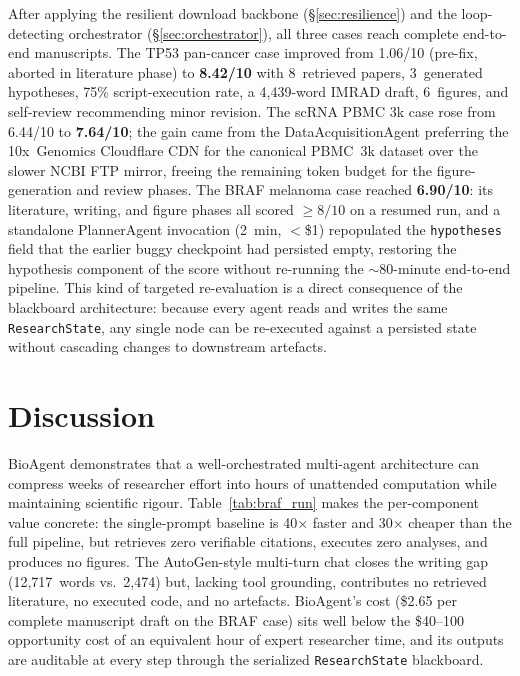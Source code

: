 \documentclass[11pt]{article}
\begin{document}
After applying the resilient download backbone (\S\ref{sec:resilience})
and the loop-detecting orchestrator (\S\ref{sec:orchestrator}), all three
cases reach complete end-to-end manuscripts.
The TP53 pan-cancer case improved from 1.06/10 (pre-fix, aborted in
literature phase) to \textbf{8.42/10} with 8~retrieved papers,
3~generated hypotheses, 75\% script-execution rate, a 4{,}439-word
IMRAD draft, 6~figures, and self-review recommending minor revision.
The scRNA PBMC 3k case rose from 6.44/10 to \textbf{7.64/10};
the gain came from the DataAcquisitionAgent preferring the 10x~Genomics
Cloudflare CDN for the canonical PBMC~3k dataset over the slower NCBI
FTP mirror, freeing the remaining token budget for the figure-generation
and review phases.
The BRAF melanoma case reached \textbf{6.90/10}: its literature,
writing, and figure phases all scored $\geq 8/10$ on a resumed run,
and a standalone PlannerAgent invocation (2~min, $<$\$1) repopulated
the \texttt{hypotheses} field that the earlier buggy checkpoint had
persisted empty, restoring the hypothesis component of the score
without re-running the $\sim$80-minute end-to-end pipeline. This kind
of targeted re-evaluation is a direct consequence of the blackboard
architecture: because every agent reads and writes the same
\texttt{ResearchState}, any single node can be re-executed against a
persisted state without cascading changes to downstream artefacts.

\section{Discussion}

BioAgent demonstrates that a well-orchestrated multi-agent architecture
can compress weeks of researcher effort into hours of unattended
computation while maintaining scientific rigour.
Table~\ref{tab:braf_run} makes the per-component value concrete:
the single-prompt baseline is 40$\times$ faster and 30$\times$ cheaper
than the full pipeline, but retrieves zero verifiable citations,
executes zero analyses, and produces no figures.
The AutoGen-style multi-turn chat closes the writing gap
(12{,}717~words vs.\ 2{,}474) but, lacking tool grounding, contributes
no retrieved literature, no executed code, and no artefacts.
BioAgent's cost (\$2.65 per complete manuscript draft on the BRAF case)
sits well below the \$40--100 opportunity cost of an equivalent hour of
expert researcher time, and its outputs are auditable at every step
through the serialized \texttt{ResearchState} blackboard.
\end{document}

